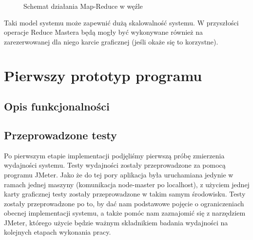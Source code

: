 \documentclass[paper=a4, fontsize=11pt]{scrartcl} %
\numberwithin{equation}{section} %
\numberwithin{figure}{section} %
\numberwithin{table}{section} %
\begin{document}
\begin{itemize}
		\begin{figure}[t]
			\begin{center}
				\caption{Schemat działania Map-Reduce w węźle}
			\end{center}
		\end{figure}
\end{itemize}
\clearpage

Taki model systemu może zapewnić dużą skalowalność systemu. W przyszłości operacje Reduce Mastera będą mogły być wykonywane również na zarezerwowanej dla niego karcie graficznej (jeśli okaże się to korzystne).

\section{Pierwszy prototyp programu}
	\subsection{Opis funkcjonalności}
	\subsection{Przeprowadzone testy}
	Po pierwszym etapie implementacji podjęliśmy pierwszą próbę zmierzenia wydajności systemu. Testy wydajności zostały przeprowadzone za pomocą programu JMeter. Jako że do tej pory aplikacja była uruchamiana jedynie w ramach jednej maszyny (komunikacja node-master po localhost), z użyciem jednej karty graficznej testy zostały przeprowadzone w takim samym środowisku. Testy zostały przeprowadzone po to, by dać nam podstawowe pojęcie o ograniczeniach obecnej implementacji systemu, a także pomóc nam zaznajomić się z narzędziem JMeter, którego użycie będzie ważnym składnikiem badania wydajności na kolejnych etapach wykonania pracy.
	
\end{document}
